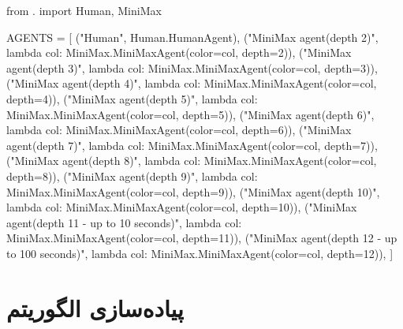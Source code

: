 \begin{latin}
\begin{python}
from . import Human, MiniMax


AGENTS = [
        ("Human", Human.HumanAgent), 
        ("MiniMax agent(depth 2)", lambda col: MiniMax.MiniMaxAgent(color=col,
            depth=2)),
        ("MiniMax agent(depth 3)", lambda col: MiniMax.MiniMaxAgent(color=col,
            depth=3)),
        ("MiniMax agent(depth 4)", lambda col: MiniMax.MiniMaxAgent(color=col,
            depth=4)),
        ("MiniMax agent(depth 5)", lambda col: MiniMax.MiniMaxAgent(color=col,
            depth=5)),
        ("MiniMax agent(depth 6)", lambda col: MiniMax.MiniMaxAgent(color=col,
            depth=6)),
        ("MiniMax agent(depth 7)", lambda col: MiniMax.MiniMaxAgent(color=col,
            depth=7)),
        ("MiniMax agent(depth 8)", lambda col: MiniMax.MiniMaxAgent(color=col,
            depth=8)),
        ("MiniMax agent(depth 9)", lambda col: MiniMax.MiniMaxAgent(color=col,
            depth=9)),
        ("MiniMax agent(depth 10)", lambda col: MiniMax.MiniMaxAgent(color=col,
            depth=10)),
        ("MiniMax agent(depth 11 - up to 10 seconds)", lambda col: MiniMax.MiniMaxAgent(color=col,
            depth=11)),
        ("MiniMax agent(depth 12 - up to 100 seconds)", lambda col: MiniMax.MiniMaxAgent(color=col,
            depth=12)),
        ]

\end{python}
\end{latin}


\chapter{پیاده‌سازی الگوریتم }

